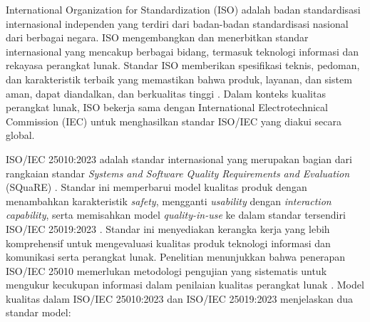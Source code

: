 International Organization for Standardization (ISO) adalah badan standardisasi internasional independen yang terdiri dari badan-badan standardisasi nasional dari berbagai negara. ISO mengembangkan dan menerbitkan standar internasional yang mencakup berbagai bidang, termasuk teknologi informasi dan rekayasa perangkat lunak. Standar ISO memberikan spesifikasi teknis, pedoman, dan karakteristik terbaik yang memastikan bahwa produk, layanan, dan sistem aman, dapat diandalkan, dan berkualitas tinggi \citep{ISO_2026_About}. Dalam konteks kualitas perangkat lunak, ISO bekerja sama dengan International Electrotechnical Commission (IEC) untuk menghasilkan standar ISO/IEC yang diakui secara global.

ISO/IEC 25010:2023 adalah standar internasional yang merupakan bagian dari rangkaian standar \textit{Systems and Software Quality Requirements and Evaluation} (SQuaRE) \citep{ISO25010_2023}. Standar ini memperbarui model kualitas produk dengan menambahkan karakteristik \textit{safety}, mengganti \textit{usability} dengan \textit{interaction capability}, serta memisahkan model \textit{quality-in-use} ke dalam standar tersendiri ISO/IEC 25019:2023 \citep{ISO25019_2023}. Standar ini menyediakan kerangka kerja yang lebih komprehensif untuk mengevaluasi kualitas produk teknologi informasi dan komunikasi serta perangkat lunak. Penelitian menunjukkan bahwa penerapan ISO/IEC 25010 memerlukan metodologi pengujian yang sistematis untuk mengukur kecukupan informasi dalam penilaian kualitas perangkat lunak \citep{Hovorushchenko_2018_ISO25010}. Model kualitas dalam ISO/IEC 25010:2023 dan ISO/IEC 25019:2023 menjelaskan dua standar model:

